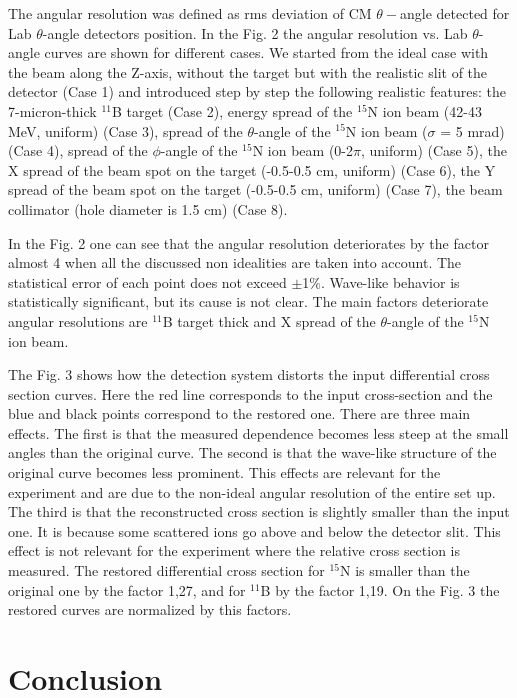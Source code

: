 \documentclass[%
 aip,
cp,  %
 amsmath,amssymb,%
 reprint,%
]{revtex4-2}
\begin{document}
The angular resolution was defined as rms deviation of CM $\theta-$angle detected for Lab $\theta$-angle detectors position.
In the Fig. 2 the angular resolution vs. Lab $\theta$-angle curves are shown for different cases. We started from the ideal case with the beam along the Z-axis, without the target but with the realistic slit of the detector (Case 1) and introduced step by step the following realistic features: the 7-micron-thick ${}^{11}$B target (Case 2), energy spread of the ${}^{15}$N ion beam (42-43 MeV, uniform) (Case 3), spread of the $\theta$-angle of the ${}^{15}$N ion beam ($\sigma$ = 5 mrad) (Case 4),  spread of the $\phi$-angle of the ${}^{15}$N ion beam (0-2$\pi$, uniform) (Case 5), the X spread of the beam spot on the target (-0.5-0.5 cm, uniform) (Case 6), the Y spread of the beam spot on the target (-0.5-0.5 cm, uniform) (Case 7), the beam collimator (hole diameter is 1.5 cm)  (Case 8).


In the Fig. 2 one can see that the angular resolution deteriorates by the factor almost 4 when all the discussed non idealities are taken into account. The statistical error of each point does not exceed $\pm$1$\%$. Wave-like behavior is statistically significant, but its cause is not clear. The main factors deteriorate angular resolutions are ${}^{11}$B target thick and X spread of the $\theta$-angle of the ${}^{15}$N ion beam.

The Fig. 3 shows how the detection system distorts the input differential cross section curves. Here the red line corresponds to the input cross-section and the blue and black points correspond to the restored one. There are three main effects. The first is that the measured dependence becomes less steep at the small angles than the original curve. The second is that the wave-like structure of the original curve becomes less prominent. This effects are relevant for the experiment and are due to the non-ideal angular resolution of the entire set up.
The third is that the reconstructed cross section is slightly smaller than the input one. It is because some scattered ions go above and below the detector slit. This effect is not relevant for the experiment where the relative cross section is measured. The restored differential cross section for ${}^{15}$N is smaller than the original one by the factor 1,27, and for ${}^{11}$B by the factor 1,19. On the Fig. 3 the restored curves are normalized by this factors.

\section{Conclusion}
\end{document}
